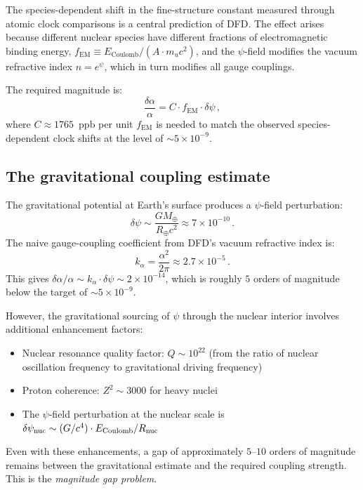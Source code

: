 \documentclass[aps,prd,twocolumn,superscriptaddress,floatfix,nofootinbib]{revtex4-2}
\newcommand{\fEM}{f_{\mathrm{EM}}}
\begin{document}
The species-dependent shift in the fine-structure constant measured through
atomic clock comparisons is a central prediction of DFD. The effect arises
because different nuclear species have different fractions of electromagnetic
binding energy, $\fEM \equiv E_{\mathrm{Coulomb}} / (A \cdot m_u c^2)$, and the
$\psi$-field modifies the vacuum refractive index $n = e^\psi$, which in turn
modifies all gauge couplings.

The required magnitude is:
\begin{equation}
\frac{\delta\alpha}{\alpha} = C \cdot \fEM \cdot \delta\psi \, ,
\label{eq:alpha_shift}
\end{equation}
where $C \approx 1765$~ppb per unit $\fEM$ is needed to match the observed
species-dependent clock shifts at the level of $\sim 5 \times 10^{-9}$.

\subsection{The gravitational coupling estimate}

The gravitational potential at Earth's surface produces a $\psi$-field
perturbation:
\begin{equation}
\delta\psi \sim \frac{GM_\oplus}{R_\oplus c^2} \approx 7 \times 10^{-10} \, .
\end{equation}
The naive gauge-coupling coefficient from DFD's vacuum refractive index is:
\begin{equation}
k_\alpha = \frac{\alpha^2}{2\pi} \approx 2.7 \times 10^{-5} \, .
\end{equation}
This gives $\delta\alpha/\alpha \sim k_\alpha \cdot \delta\psi \sim 2 \times
10^{-14}$, which is roughly $5$ orders of magnitude below the target of $\sim 5
\times 10^{-9}$.

However, the gravitational sourcing of $\psi$ through the nuclear interior
involves additional enhancement factors:
\begin{itemize}
\item Nuclear resonance quality factor: $Q \sim 10^{22}$ (from the ratio of
nuclear oscillation frequency to gravitational driving frequency)
\item Proton coherence: $Z^2 \sim 3000$ for heavy nuclei
\item The $\psi$-field perturbation at the nuclear scale is $\delta\psi_{\rm
nuc} \sim (G/c^4) \cdot E_{\rm Coulomb}/R_{\rm nuc}$
\end{itemize}

Even with these enhancements, a gap of approximately $5$--$10$ orders of
magnitude remains between the gravitational estimate and the required coupling
strength. This is the \emph{magnitude gap problem}.
\end{document}

